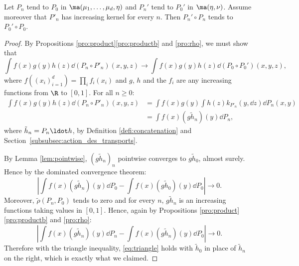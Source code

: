\begin{pro}\label{pro:continuity}
Let $P_n$ tend to $P_0$ in $\ma(\mu_1,\ldots,\mu_d,\eta)$ and $P_n'$ tend to $P_0'$ in $\ma(\eta,\nu)$. Assume moreover that $P'_n$ has increasing kernel for every $n$. Then $P_n'\circ P_n$ tends to $P_0'\circ P_0$.
\end{pro}

\begin{proof}
By Propositions \ref{pro:product}\eqref{pro:productb} and \ref{pro:rho}, we must show that\vspace*{-3pt}
\[
\int f(x)g(y)h(z)\dd (P_n\circ P'_n)(x,y,z)\to \int f(x)g(y)h(z)\dd (P_0\circ P_0')(x,y,z),
\]
where $f((x_i)_{i=1}^d)=\prod_if_i(x_i)$ and $g$, $h$ and the $f_i$ are any increasing functions from $\R$ to $[0,1]$. For all $n\geqslant0$:
\begin{align*}
\int f(x)g(y)h(z)\dd (P_n\circ P'_n)(x,y,z)&=\int f(x)g(y)\int h(z) k_{P'_n}(y,\dd z)\dd P_n(x,y)\\
&=\int f(x)(g\tilde h_n)(y)\dd P_n,
\end{align*}
where $\tilde h_n=P_{n}{}\ldot h$, by Definition \ref{defi:concatenation} and Section~\ref{subsubsec:action_des_transports}.

By Lemma \ref{lem:pointwise}, $(g\tilde{h}_n)_n$ pointwise converges to $g\tilde{h}_0$, almost surely. Hence by the dominated convergence theorem:
\[\left|\int f(x)(g\tilde h_n)(y)\dd P_0-\int f(x)(g\tilde h_0)(y)\dd P_0\right|\to0.\]
Moreover, $\tilde{\rho}(P_n,P_0)$ tends to zero and for every $n$, $g\tilde h_n$ is an increasing functions taking values in $[0,1]$. Hence, again by Propositions \ref{pro:product}\eqref{pro:productb} and \ref{pro:rho}:
\begin{equation}\label{eq:triangle}
\left|\int f(x)(g \tilde h_n)(y)\dd P_n-\int f(x)(g \tilde h_n)(y)\dd P_0\right|\to0.
\end{equation}
Therefore with the triangle inequality, \eqref{eq:triangle} holds with $\tilde h_0$ in place of $\tilde h_n$ on the right,
which is exactly what we claimed.
\end{proof}

